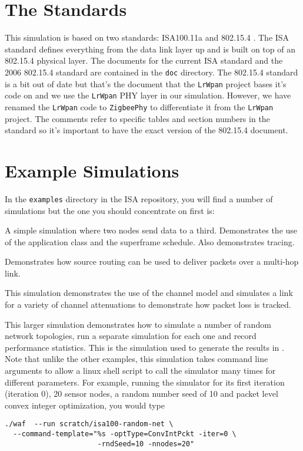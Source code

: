 \documentclass[12pt,letterpaper]{article}
\begin{document}
\section{The Standards}
\label{sec:standards}

This simulation is based on two standards: ISA100.11a and 802.15.4 \cite{isa100.11a,zigbee}.  The ISA standard defines everything from the data link layer up and is built on top of an 802.15.4 physical layer.  The documents for the current ISA standard and the 2006 802.15.4 standard are contained in the {\tt doc} directory.  The 802.15.4 standard is a bit out of date but that's the document that the {\tt LrWpan} project bases it's code on and we use the {\tt LrWpan} PHY layer in our simulation.  However, we have renamed the {\tt LrWpan} code to {\tt ZigbeePhy} to differentiate it from the {\tt LrWpan} project.  The comments refer to specific tables and section numbers in the standard so it's important to have the exact version of the 802.15.4 document.

\section{Example Simulations}
\label{sec:sims}

In the {\tt examples} directory in the ISA repository, you will find a number of simulations but the one you should concentrate on first is:

\begin{itemize}

   A simple simulation where two nodes send data to a third.  Demonstrates the use of the application class and the superframe schedule.  Also demonstrates tracing.

   Demonstrates how source routing can be used to deliver packets over a multi-hop link.

 This simulation demonstrates the use of the channel model and simulates a link for a variety of channel attenuations to demonstrate how packet loss is tracked.

 This larger simulation demonstrates how to simulate a number of random network topologies, run a separate simulation for each one and record performance statistics.  This is the simulation used to generate the results in \cite{me-tii-2018}.  Note that unlike the other examples, this simulation takes command line arguments to allow a linux shell script to call the simulator many times for different parameters.  For example, running the simulator for its first iteration (iteration 0), 20 sensor nodes, a random number seed of 10 and packet level convex integer optimization, you would type

\begin{verbatim}
./waf  --run scratch/isa100-random-net \
  --command-template="%s -optType=ConvIntPckt -iter=0 \
                      -rndSeed=10 -nnodes=20"
\end{verbatim}
\end{itemize}
\end{document}
